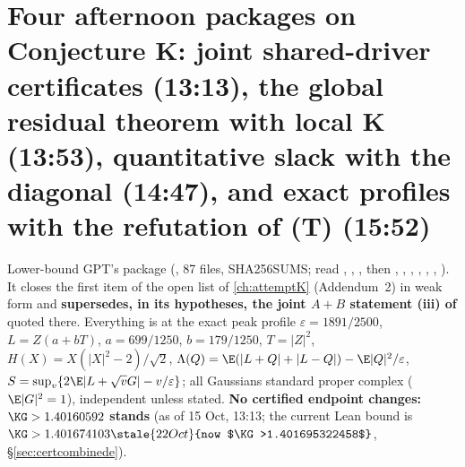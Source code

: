 \section{Four afternoon packages on Conjecture K: joint shared-driver certificates (13:13), the global residual theorem with local K (13:53), quantitative slack with the diagonal (14:47), and exact profiles with the refutation of (T) (15:52)}\label{ch:kjoint}

Lower-bound GPT's package  (, 87 files, SHA256SUMS; read
, , , then , ,
, , ,
, ). It closes the first item of the open list of
\autoref{ch:attemptK} (Addendum~2) in weak form and \textbf{supersedes, in its hypotheses, the joint $A{+}B$ statement (iii) of } quoted there.
Everything is at the exact peak profile $\varepsilon=1891/2500$, $L=Z(a+bT)$, $a=699/1250$, $b=179/1250$, $T=|Z|^2$, $H(X)=X(|X|^2-2)/\sqrt2$,
$\Lambda(Q)=\E(|L+Q|+|L-Q|)-\E|Q|^2/\varepsilon$, $S=\sup_v\{2\E|L+\sqrt vG|-v/\varepsilon\}$; all Gaussians standard proper complex ($\E|G|^2=1$), independent unless stated.
\textbf{No certified endpoint changes: $\KG>1.40160592$ stands} (as of 15 Oct, 13:13; the current Lean bound is $\KG>1.401674103\stale{22 Oct}{now $\KG>1.401695322458$}$, \S\ref{sec:certcombinede}).


